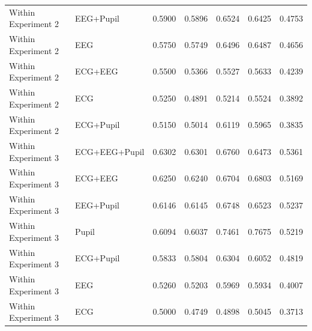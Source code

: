 \begin{table}[t]
\begin{tabular}{llccccc}
Within Experiment 2 & EEG+Pupil & 0.5900 & 0.5896 & 0.6524 & 0.6425 & 0.4753 \\
Within Experiment 2 & EEG & 0.5750 & 0.5749 & 0.6496 & 0.6487 & 0.4656 \\
Within Experiment 2 & ECG+EEG & 0.5500 & 0.5366 & 0.5527 & 0.5633 & 0.4239 \\
Within Experiment 2 & ECG & 0.5250 & 0.4891 & 0.5214 & 0.5524 & 0.3892 \\
Within Experiment 2 & ECG+Pupil & 0.5150 & 0.5014 & 0.6119 & 0.5965 & 0.3835 \\
Within Experiment 3 & ECG+EEG+Pupil & 0.6302 & 0.6301 & 0.6760 & 0.6473 & 0.5361 \\
Within Experiment 3 & ECG+EEG & 0.6250 & 0.6240 & 0.6704 & 0.6803 & 0.5169 \\
Within Experiment 3 & EEG+Pupil & 0.6146 & 0.6145 & 0.6748 & 0.6523 & 0.5237 \\
Within Experiment 3 & Pupil & 0.6094 & 0.6037 & 0.7461 & 0.7675 & 0.5219 \\
Within Experiment 3 & ECG+Pupil & 0.5833 & 0.5804 & 0.6304 & 0.6052 & 0.4819 \\
Within Experiment 3 & EEG & 0.5260 & 0.5203 & 0.5969 & 0.5934 & 0.4007 \\
Within Experiment 3 & ECG & 0.5000 & 0.4749 & 0.4898 & 0.5045 & 0.3713 \\
\hline
\end{tabular}
\end{table}
